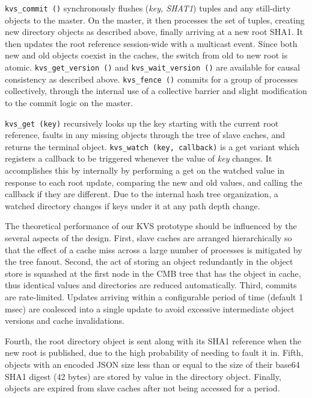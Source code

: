{\tt kvs\_commit ()} synchronously flushes ({\em key, SHAT1}) tuples
and any still-dirty objects to the master.  On the master, it then
processes the set of tuples, creating new directory objects as described
above, finally arriving at a new root SHA1.  It then updates the 
root reference session-wide with a multicast event.
Since both new and old objects coexist in the caches, the switch from old
to new root is atomic.
{\tt kvs\_get\_version ()} and {\tt kvs\_wait\_version ()} are available
for causal consistency as described above.
{\tt kvs\_fence ()} commits for a group of processes collectively,
through the internal use of a collective barrier
and slight modification to the commit logic on the master.

{\tt kvs\_get (key)} recursively looks up the key starting with the
current root reference, faults in any missing objects
through the tree of slave caches, and returns the terminal object.
{\tt kvs\_watch (key, callback)} is a get variant which registers a
callback to be triggered whenever the value of {\em key} changes.
It accomplishes this by internally by performing a get on the watched
value in response to each root update, comparing the new
and old values, and calling the callback if they are different.
Due to the internal hash tree organization, a watched directory changes
if keys under it at any path depth change.

The theoretical performance of our KVS prototype should be influenced by
the several aspects of the design. First,  
slave caches are arranged hierarchically so that the effect of a
cache miss across a large number of processes is mitigated by the tree
fanout. Second, the act of storing an object redundantly in the object store
is squashed at the first node in the CMB tree that has the object
in cache, thus identical values and directories are reduced automatically.
Third, commits are rate-limited.  Updates arriving within a configurable
period of time (default 1 msec) are coalesced into a single update to
avoid excessive intermediate object versions and cache invalidations.

Fourth, the root directory object is sent along with its SHA1 reference when the
new root is published, due to the high probability of needing to fault it in.
Fifth, objects with an encoded JSON size less than or equal to the size
of their base64 SHA1 digest (42 bytes) are stored by value in the directory
object. Finally, objects are expired from slave caches after not being accessed for
a period. %

%
